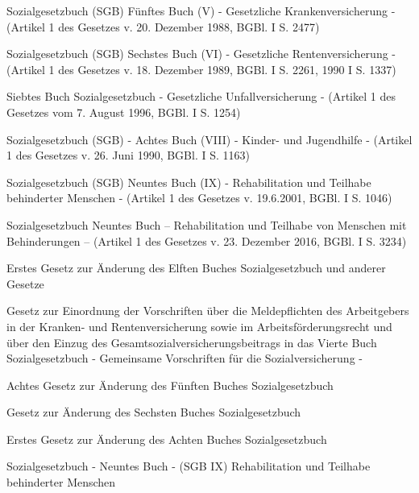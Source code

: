 \item[{SGB-5}] Sozialgesetzbuch (SGB) Fünftes Buch (V) - Gesetzliche Krankenversicherung - (Artikel 1 des Gesetzes v. 20. Dezember 1988, BGBl. I S. 2477)

\item[{SGB-6}] Sozialgesetzbuch (SGB) Sechstes Buch (VI) - Gesetzliche Rentenversicherung - (Artikel 1 des Gesetzes v. 18. Dezember 1989, BGBl. I S. 2261, 1990 I S. 1337)

\item[{SGB-7}] Siebtes Buch Sozialgesetzbuch - Gesetzliche Unfallversicherung - (Artikel 1 des Gesetzes vom 7. August 1996, BGBl. I S. 1254)

\item[{SGB-8}] Sozialgesetzbuch (SGB) - Achtes Buch (VIII) - Kinder- und Jugendhilfe - (Artikel 1 des Gesetzes v. 26. Juni 1990, BGBl. I S. 1163)

\item[{SGB-9}] Sozialgesetzbuch (SGB) Neuntes Buch (IX) - Rehabilitation und Teilhabe behinderter Menschen - (Artikel 1 des Gesetzes v. 19.6.2001, BGBl. I S. 1046)

\item[{SGB-9-2018}] Sozialgesetzbuch Neuntes Buch – Rehabilitation und Teilhabe von Menschen mit Behinderungen – (Artikel 1 des Gesetzes v. 23. Dezember 2016, BGBl. I S. 3234)

\item[{SGB11ÄndG-1}] Erstes Gesetz zur Änderung des Elften Buches Sozialgesetzbuch und anderer Gesetze

\item[{SGB4ErgG}] Gesetz zur Einordnung der Vorschriften über die Meldepflichten des Arbeitgebers in der Kranken- und Rentenversicherung sowie im Arbeitsförderungsrecht und über den Einzug des Gesamtsozialversicherungsbeitrags in das Vierte Buch Sozialgesetzbuch - Gemeinsame Vorschriften für die Sozialversicherung -

\item[{SGB5ÄndG-8}] Achtes Gesetz zur Änderung des Fünften Buches Sozialgesetzbuch

\item[{SGB6ÄndG}] Gesetz zur Änderung des Sechsten Buches Sozialgesetzbuch

\item[{SGB8ÄndG-1}] Erstes Gesetz zur Änderung des Achten Buches Sozialgesetzbuch

\item[{SGB9uaÄndG}] Sozialgesetzbuch - Neuntes Buch - (SGB IX) Rehabilitation und Teilhabe behinderter Menschen

